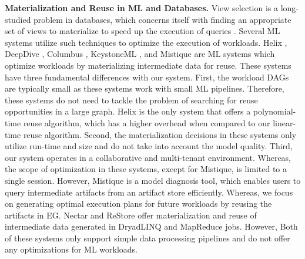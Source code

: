 \textbf{Materialization and Reuse in ML and Databases.}
View selection is a long-studied problem in databases, which concerns itself with finding an appropriate set of views to materialize to speed up the execution of queries \cite{mami2012survey}.
Several ML systems utilize such techniques to optimize the execution of workloads. 
Helix \cite{xin2018h, xin2018helix}, DeepDive \cite{zhang2015deepdive}, Columbus \cite{zhang2016materialization}, KeystoneML \cite{sparks2017keystoneml}, and Mistique \cite{vartak2018mistique} are ML systems which optimize workloads by materializing intermediate data for reuse.
These systems have three fundamental differences with our system.
First, the workload DAGs are typically small as these systems work with small ML pipelines.
Therefore, these systems do not need to tackle the problem of searching for reuse opportunities in a large graph.
Helix is the only system that offers a polynomial-time reuse algorithm, which has a higher overhead when compared to our linear-time reuse algorithm.
Second, the materialization decisions in these systems only utilize run-time and size and do not take into account the model quality.
Third, our system operates in a collaborative and multi-tenant environment.
Whereas, the scope of optimization in these systems, except for Mistique, is limited to a single session.
However, Mistique is a model diagnosis tool, which enables users to query intermediate artifacts from an artifact store efficiently.
Whereas, we focus on generating optimal execution plans for future workloads by reusing the artifacts in EG.
Nectar \cite{gunda2010nectar} and ReStore \cite{elghandour2012restore} offer materialization and reuse of intermediate data generated in DryadLINQ \cite{fetterly2009dryadlinq} and MapReduce jobs.
However, Both of these systems only support simple data processing pipelines and do not offer any optimizations for ML workloads.